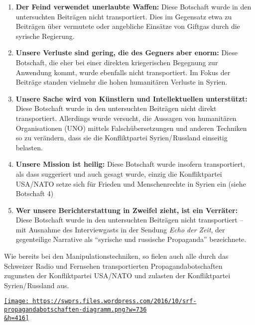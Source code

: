 \begin{enumerate}
{  Versehen:} Diese Botschaft wurde transportiert, indem suggeriert
  wurde, die Konfliktpartei Syrien/ Russland habe absichtlich den
  Hilfskonvoi angegriffen. Im Interview der Sendung \emph{Echo der Zeit}
  wurde zudem behauptet, beim US-Angriff auf syrische Truppen habe es
  sich um ein Versehen gehandelt.
\item
  \textbf{Der Feind verwendet unerlaubte Waffen:} Diese Botschaft wurde
  in den untersuchten Beiträgen nicht transportiert. Dies im Gegensatz
  etwa zu Beiträgen über vermutete oder angebliche Einsätze von Giftgas
  durch die syrische Regierung.
\item
  \textbf{Unsere Verluste sind gering, die des Gegners aber enorm:}
  Diese Botschaft, die eher bei einer direkten kriegerischen Begegnung
  zur Anwendung kommt, wurde ebenfalls nicht transportiert. Im Fokus der
  Beiträge standen vielmehr die hohen humanitären Verluste in Syrien.
\item
  \textbf{Unsere Sache wird von Künstlern und Intellektuellen
  unterstützt:} Diese Botschaft wurde in den untersuchten Beiträgen
  nicht direkt transportiert. Allerdings wurde versucht, die Aussagen
  von humanitären Organisationen (UNO) mittels Falsch­übersetzungen und
  anderen Techniken so zu verändern, dass sie die Konfliktpartei
  Syrien/ Russland einseitig belasten.
\item
  \textbf{Unsere Mission ist heilig:} Diese Botschaft wurde insofern
  transportiert, als dass suggeriert und auch gesagt wurde, einzig die
  Konfliktpartei USA/NATO setze sich für Frieden und Menschenrechte in
  Syrien ein (siehe Botschaft 4)
\item
  \textbf{Wer unsere Berichterstattung in Zweifel zieht, ist ein
  Verräter:} Diese Botschaft wurde in den untersuchten Beiträgen nicht
  transportiert -- mit Ausnahme des Interviewgasts in der Sendung
  \emph{Echo der Zeit}, der gegenteilige Narrative als ``syrische und
  russische Propaganda'' bezeichnete.
\end{enumerate}

Wie bereits bei den Manipulationstechniken, so fielen auch alle durch
das Schweizer Radio und Fernsehen transportierten Propagandabotschaften
zugunsten der Konfliktpartei USA/NATO und zulasten der Konfliktpartei
Syrien/ Russland aus.

\href{https://swprs.files.wordpress.com/2016/10/srf-propagandabotschaften-diagramm.png}{\texttt{[image: https://swprs.files.wordpress.com/2016/10/srf-propagandabotschaften-diagramm.png?w=736\\\&h=416]}}

